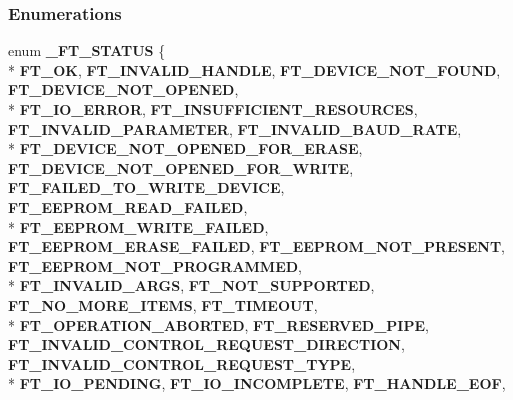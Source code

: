 \subsubsection*{Enumerations}
\begin{DoxyCompactItemize}
\item 
enum {\bf \+\_\+\+F\+T\+\_\+\+S\+T\+A\+T\+US} \{ \\*
{\bf F\+T\+\_\+\+OK}, 
{\bf F\+T\+\_\+\+I\+N\+V\+A\+L\+I\+D\+\_\+\+H\+A\+N\+D\+LE}, 
{\bf F\+T\+\_\+\+D\+E\+V\+I\+C\+E\+\_\+\+N\+O\+T\+\_\+\+F\+O\+U\+ND}, 
{\bf F\+T\+\_\+\+D\+E\+V\+I\+C\+E\+\_\+\+N\+O\+T\+\_\+\+O\+P\+E\+N\+ED}, 
\\*
{\bf F\+T\+\_\+\+I\+O\+\_\+\+E\+R\+R\+OR}, 
{\bf F\+T\+\_\+\+I\+N\+S\+U\+F\+F\+I\+C\+I\+E\+N\+T\+\_\+\+R\+E\+S\+O\+U\+R\+C\+ES}, 
{\bf F\+T\+\_\+\+I\+N\+V\+A\+L\+I\+D\+\_\+\+P\+A\+R\+A\+M\+E\+T\+ER}, 
{\bf F\+T\+\_\+\+I\+N\+V\+A\+L\+I\+D\+\_\+\+B\+A\+U\+D\+\_\+\+R\+A\+TE}, 
\\*
{\bf F\+T\+\_\+\+D\+E\+V\+I\+C\+E\+\_\+\+N\+O\+T\+\_\+\+O\+P\+E\+N\+E\+D\+\_\+\+F\+O\+R\+\_\+\+E\+R\+A\+SE}, 
{\bf F\+T\+\_\+\+D\+E\+V\+I\+C\+E\+\_\+\+N\+O\+T\+\_\+\+O\+P\+E\+N\+E\+D\+\_\+\+F\+O\+R\+\_\+\+W\+R\+I\+TE}, 
{\bf F\+T\+\_\+\+F\+A\+I\+L\+E\+D\+\_\+\+T\+O\+\_\+\+W\+R\+I\+T\+E\+\_\+\+D\+E\+V\+I\+CE}, 
{\bf F\+T\+\_\+\+E\+E\+P\+R\+O\+M\+\_\+\+R\+E\+A\+D\+\_\+\+F\+A\+I\+L\+ED}, 
\\*
{\bf F\+T\+\_\+\+E\+E\+P\+R\+O\+M\+\_\+\+W\+R\+I\+T\+E\+\_\+\+F\+A\+I\+L\+ED}, 
{\bf F\+T\+\_\+\+E\+E\+P\+R\+O\+M\+\_\+\+E\+R\+A\+S\+E\+\_\+\+F\+A\+I\+L\+ED}, 
{\bf F\+T\+\_\+\+E\+E\+P\+R\+O\+M\+\_\+\+N\+O\+T\+\_\+\+P\+R\+E\+S\+E\+NT}, 
{\bf F\+T\+\_\+\+E\+E\+P\+R\+O\+M\+\_\+\+N\+O\+T\+\_\+\+P\+R\+O\+G\+R\+A\+M\+M\+ED}, 
\\*
{\bf F\+T\+\_\+\+I\+N\+V\+A\+L\+I\+D\+\_\+\+A\+R\+GS}, 
{\bf F\+T\+\_\+\+N\+O\+T\+\_\+\+S\+U\+P\+P\+O\+R\+T\+ED}, 
{\bf F\+T\+\_\+\+N\+O\+\_\+\+M\+O\+R\+E\+\_\+\+I\+T\+E\+MS}, 
{\bf F\+T\+\_\+\+T\+I\+M\+E\+O\+UT}, 
\\*
{\bf F\+T\+\_\+\+O\+P\+E\+R\+A\+T\+I\+O\+N\+\_\+\+A\+B\+O\+R\+T\+ED}, 
{\bf F\+T\+\_\+\+R\+E\+S\+E\+R\+V\+E\+D\+\_\+\+P\+I\+PE}, 
{\bf F\+T\+\_\+\+I\+N\+V\+A\+L\+I\+D\+\_\+\+C\+O\+N\+T\+R\+O\+L\+\_\+\+R\+E\+Q\+U\+E\+S\+T\+\_\+\+D\+I\+R\+E\+C\+T\+I\+ON}, 
{\bf F\+T\+\_\+\+I\+N\+V\+A\+L\+I\+D\+\_\+\+C\+O\+N\+T\+R\+O\+L\+\_\+\+R\+E\+Q\+U\+E\+S\+T\+\_\+\+T\+Y\+PE}, 
\\*
{\bf F\+T\+\_\+\+I\+O\+\_\+\+P\+E\+N\+D\+I\+NG}, 
{\bf F\+T\+\_\+\+I\+O\+\_\+\+I\+N\+C\+O\+M\+P\+L\+E\+TE}, 
{\bf F\+T\+\_\+\+H\+A\+N\+D\+L\+E\+\_\+\+E\+OF}, 

\end{DoxyCompactItemize}
